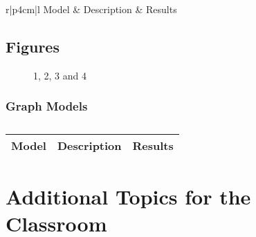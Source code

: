 \centering	
\begin{table}[H]\tiny
	\caption{}	
	\begin{tabular}{r|p{4cm}|l}
		\hline	
		Model & Description & Results \\
		\hline 
		\hline 
	\end{tabular}
\end{table}

\subsection{Figures}

\begin{figure}[H]
	\centering
	\begin{minipage}[b]{0.5\linewidth}
	\end{minipage}\hfill
	\begin{minipage}[b]{0.5\linewidth}
	\end{minipage}\hfill	
	\begin{minipage}[b]{0.5\linewidth}
	\end{minipage}\hfill
	\begin{minipage}[b]{0.5\linewidth}
	\end{minipage}\hfill
	\caption{1, 2, 3 and 4}
	\label{fig:Figure1}
\end{figure} 

\subsubsection{Graph Models}

\centering	
\begin{table}[H]\tiny
	\caption{}	
	\begin{tabular}{r|p{4cm}|l}
		\hline	
		Model & Description & Results \\
		\hline 
		\hline 
	\end{tabular}
\end{table}

\section{Additional Topics for the Classroom}

\begin{enumerate}
\end{enumerate}


